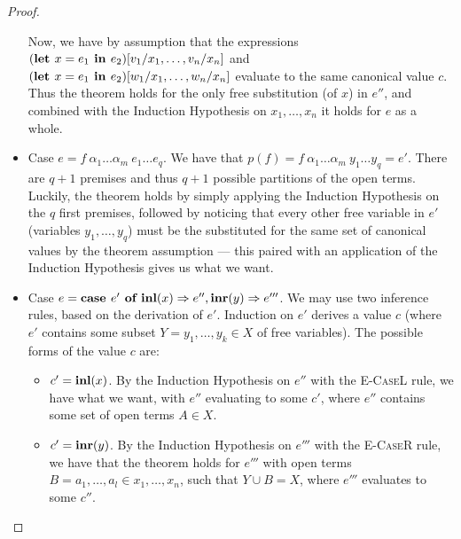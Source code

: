 \begin{proof}
\begin{itemize}
    Now, we have by assumption that the expressions $(\textbf{let } x = e_1 \textbf{ in } e_2)[v_1 /
    x_1, \dots, v_n / x_n]$ and $(\textbf{let } x = e_1 \textbf{ in } e_2)[w_1 / x_1, \dots, w_n /
    x_n]$ evaluate to the same canonical value $c$. Thus the theorem holds for
    the only free substitution (of $x$) in $e''$, and combined with the
    Induction Hypothesis on $x_1, \dots, x_n$ it holds for $e$ as a whole.


  \item Case $e = f~\alpha_1 \dots \alpha_m~e_1 \dots e_q$. We have that $p(f)
    = f~\alpha_1 \dots \alpha_m~y_1 \dots y_q = e'$. There are $q+1$ premises
    and thus $q+1$ possible partitions of the open terms. Luckily, the theorem
    holds by simply applying the Induction Hypothesis on the $q$ first
    premises, followed by noticing that every other free variable in $e'$
    (variables $y_1, \dots, y_q$) must be the substituted for the same set of
    canonical values by the theorem assumption --- this paired with an
    application of the Induction Hypothesis gives us what we want.

  \item Case $e = \textbf{case } e' \textbf{ of } \textbf{inl}(x) \Rightarrow e'', \textbf{inr}(y) \Rightarrow e'''$. We may use two
    inference rules, based on the derivation of $e'$. Induction on $e'$ derives
    a value $c$ (where $e'$ contains some subset $Y = y_1, \dots, y_k \in X$ of
    free variables). The possible forms of the value $c$ are:

    \begin{itemize}

      \item $c' = \textbf{inl}(x)$. By the Induction Hypothesis on $e''$ with the
        \textsc{E-CaseL} rule, we have what we want, with $e''$ evaluating to
        some $c'$, where $e''$ contains some set of open terms $A \in X$.

      \item $c' = \textbf{inr}(y)$. By the Induction Hypothesis on $e'''$ with the
        \textsc{E-CaseR} rule, we have that the theorem holds for $e'''$ with
        open terms $B = a_1, \dots, a_l \in x_1, \dots, x_n$, such that $Y \cup
        B = X$, where $e'''$ evaluates to some $c''$.


\end{itemize}
\end{itemize}
\end{proof}
